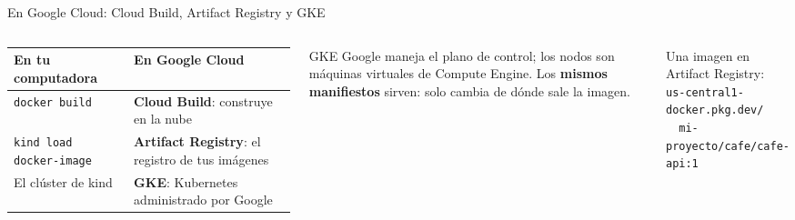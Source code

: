\documentclass[aspectratio=169,10pt,c]{beamer}
\begin{document}
\begin{frame}[fragile]{En Google Cloud: Cloud Build, Artifact Registry y GKE}
\begin{center}
\end{center}
\vspace{2mm}
\begin{columns}[T,onlytextwidth]
\renewcommand{\arraystretch}{1.25}
\small
\begin{tabular}{@{}>{\raggedright\arraybackslash}p{2.9cm}>{\raggedright\arraybackslash}p{3.3cm}@{}}
\toprule
\textbf{En tu computadora} & \textbf{En Google Cloud}\\
\midrule
\texttt{docker build} & \textbf{Cloud Build}: construye en la nube\\
\texttt{kind load docker-image} & \textbf{Artifact Registry}: el registro de tus imágenes\\
El clúster de kind & \textbf{GKE}: Kubernetes administrado por Google\\
\bottomrule
\end{tabular}
\begin{block}{GKE}
\small Google maneja el plano de control; los nodos son máquinas virtuales de Compute Engine. Los \textbf{mismos manifiestos} sirven: solo cambia de dónde sale la imagen.
\end{block}
{\scriptsize Una imagen en Artifact Registry:\\\texttt{us-central1-docker.pkg.dev/}\\\texttt{\ \ mi-proyecto/cafe/cafe-api:1}}
\end{columns}
\end{frame}
\end{document}
